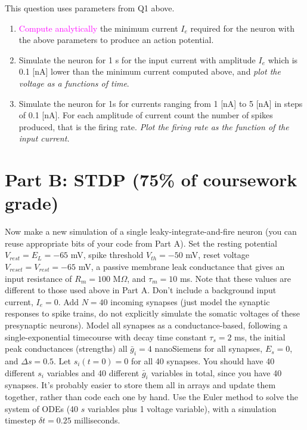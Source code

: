 \documentclass[12pt]{article}
\begin{document}
This question uses parameters from Q1 above.

\begin{enumerate}

\item \textcolor{magenta}{Compute analytically} the minimum current $I_e$ required for the
  neuron with the above parameters to produce an action
  potential.

\item Simulate the neuron for 1 s for the input current with amplitude
  $I_e$ which is 0.1 [nA] lower than the minimum current computed
  above, and \emph{plot the voltage as a functions of time}.

\item Simulate the neuron for 1s for currents ranging from 1 [nA] to 5
  [nA] in steps of 0.1 [nA]. For each amplitude of current count the
  number of spikes produced, that is the firing rate. \emph{Plot the firing
  rate as the function of the input current.} 

\end{enumerate}

\section*{Part B: STDP (75\% of coursework grade)}
Now make a new simulation of a single leaky-integrate-and-fire neuron (you can reuse appropriate bits of your code from Part A). Set the resting potential $V_{rest}= E_L = -65$ mV,
spike threshold $V_{th}=-50$ mV, reset voltage $V_{reset}=V_{rest}=-65$
mV, a passive membrane leak conductance that gives an input resistance
of $R_{m}=100$ M$\Omega$, and $\tau_{m}=10$
ms. Note that these values are different to those used above in Part A. Don't include a background input current, $I_e=0$. Add $N=40$ incoming synapses (just model the synaptic responses to spike trains, do not
explicitly simulate the somatic voltages of these presynaptic neurons).
Model all synapses as a conductance-based, following a single-exponential
timecourse with decay time constant $\tau_{s}=2$ ms, the initial
peak conductances (strengths) all $\bar{g}_i = 4$ nanoSiemens for all synapses, $E_s=0$, and $\Delta s=0.5$. Let $s_i (t=0)=0$ for all 40 synapses. You should have 40 different $s_i$ variables and 40 different $\bar{g}_i$ variables in total, since you have 40 synapses. It's probably easier to store them all in arrays and update them together, rather than code each one by hand. Use the Euler method to solve the system of ODEs (40 $s$ variables plus 1 voltage variable), with a simulation timestep $\delta t=0.25$ milliseconds.
\end{document}
